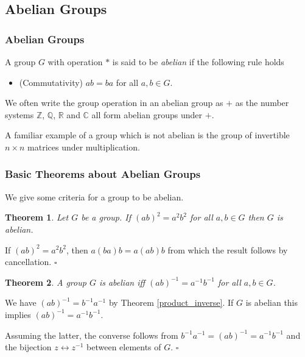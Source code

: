 \documentclass[10pt]{article}
\newcommand{\Z}{\mathbb{Z}}
\newcommand{\Q}{\mathbb{Q}}
\newcommand{\C}{\mathbb{C}}
\newcommand{\R}{\mathbb{R}}
\newtheorem{theorem}{Theorem}[section]
\newenvironment{proof}[1][Proof]{\begin{trivlist}
\item[\hskip \labelsep {\itshape #1}]}{\end{trivlist}}
\newenvironment{definition}[1][Definition]{\begin{trivlist}
\item[\hskip \labelsep {\bfseries #1}]}{\end{trivlist}}
\begin{document}
\subsection{Abelian Groups}

\subsubsection{Abelian Groups}

\begin{definition}
A group $G$ with operation $*$ is said to be \emph{abelian} if the following rule holds
\begin{itemize}
\item (Commutativity) $ab = ba$ for all $a, b \in G$.
\end{itemize}
\end{definition}

We often write the group operation in an abelian group as $+$ as the number systems $\Z$, $\Q$, $\R$ and $\C$ all form abelian groups under $+$.

A familiar example of a group which is not abelian is the group of invertible $n\times n$ matrices under multiplication. 

\subsubsection{Basic Theorems about Abelian Groups}

We give some criteria for a group to be abelian.

\begin{theorem}
Let $G$ be a group. If $(ab)^2 = a^2b^2$ for all $a, b \in G$ then $G$ is abelian.
\end{theorem}

\begin{proof}
If $(ab)^2 = a^2b^2$, then $a(ba)b = a(ab)b$ from which the result follows by cancellation. $\square$
\end{proof}

\begin{theorem}
A group $G$ is abelian iff $(ab)^{-1} = a^{-1}b^{-1}$ for all $a, b \in G$.
\end{theorem}

\begin{proof}
We have $(ab)^{-1} = b^{-1}a^{-1}$ by Theorem \ref{product_inverse}. If $G$ is abelian this implies $(ab)^{-1} = a^{-1}b^{-1}$.

Assuming the latter, the converse follows from $b^{-1}a^{-1} = (ab)^{-1} = a^{-1}b^{-1}$ and the bijection $z \leftrightarrow z^{-1}$ between elements of $G$. $\square$
\end{proof}
\end{document}
